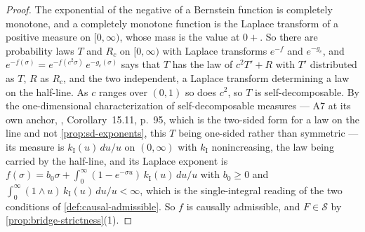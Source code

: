 \begin{proof}
The exponential of the negative of a Bernstein function is completely monotone, and a completely
monotone function is the Laplace transform of a positive measure on $[0,\infty)$, whose mass is
the value at $0{+}$. So there are probability laws $T$ and $R_c$ on $[0,\infty)$ with Laplace
transforms $e^{-f}$ and $e^{-g_c}$, and $e^{-f(\sigma)} = e^{-f(c^2\sigma)}\,e^{-g_c(\sigma)}$
says that $T$ has the law of $c^2T' + R$ with $T'$ distributed as $T$, $R$ as $R_c$, and the two
independent, a Laplace transform determining a law on the half-line. As $c$ ranges over $(0,1)$
so does $c^2$, so $T$ is self-decomposable. By the one-dimensional characterization of
self-decomposable \Levy{} measures --- A7 at its own anchor, ,
Corollary~15.11, p.~95, which is the two-sided form for a law on the line and not
\ref{prop:sd-exponents}, this $T$ being one-sided rather than symmetric --- its \Levy{}
measure is $k_{\mathrm I}(u)\,du/u$ on $(0,\infty)$ with $k_{\mathrm I}$ nonincreasing, the law
being carried by the half-line, and its Laplace exponent is
$f(\sigma) = b_0\sigma + \int_0^\infty(1 - e^{-\sigma u})\,k_{\mathrm I}(u)\,du/u$ with
$b_0 \ge 0$ and $\int_0^\infty(1 \wedge u)\,k_{\mathrm I}(u)\,du/u < \infty$, which is the
single-integral reading of the two conditions of \ref{def:causal-admissible}. So $f$ is causally
admissible, and $F \in \mathcal{S}$ by \ref{prop:bridge-strictness}(1).
\end{proof}

